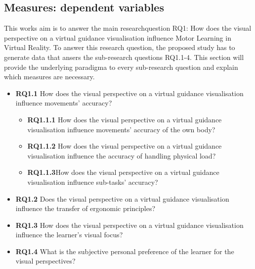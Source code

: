 \subsection{Measures: dependent variables}
This works aim is to answer the main researchquestion RQ1: How does the visual perspective on a virtual guidance visualisation influence Motor Learning in Virtual Reality. To answer this research question, the proposed study has to generate data that ansers the sub-research questions RQ1.1-4. This section will provide the underlying paradigma to every sub-research question and explain which measures are necessary.

\begin{itemize}
	\item[] \textbf{RQ1.1} How does the visual perspective on a virtual guidance visualisation influence movements' accuracy?
	\begin{itemize}
		\item[] \textbf{RQ1.1.1} How does the visual perspective on a virtual guidance visualisation influence movements' accuracy of the own body?
		\item[] \textbf{RQ1.1.2} How does the visual perspective on a virtual guidance visualisation influence the accuracy of handling physical load?
		\item[] \textbf{RQ1.1.3}How does the visual perspective on a virtual guidance visualisation influence sub-tasks' accuracy?
	\end{itemize}	
	\item[] \textbf{RQ1.2} Does the visual perspective on a virtual guidance visualisation influence the transfer of ergonomic principles?
	\item[] \textbf{RQ1.3} How does the visual perspective on a virtual guidance visualisation influence the learner's visual focus?
	\item[] \textbf{RQ1.4} What is the subjective personal preference of the learner for the visual perspectives?
\end{itemize}


